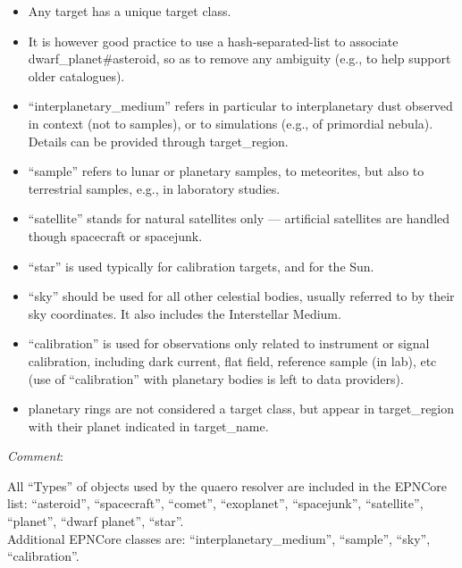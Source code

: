 \documentclass[11pt,a4paper]{ivoa}
\begin{document}
\begin{itemize}

\item Any target has a unique target class.

\item It is however good practice to use a hash-separated-list to
associate dwarf\_planet\#asteroid, so as to remove any ambiguity
(e.g., to help support older catalogues).

\item ``interplanetary\_medium'' refers in particular to interplanetary
dust observed in context (not to samples), or to simulations
(e.g., of primordial nebula).
Details can be provided through target\_region.

\item ``sample'' refers to lunar or planetary samples, to meteorites,
but also to terrestrial samples, e.g., in laboratory studies.

\item ``satellite'' stands for natural satellites only --- artificial
satellites are handled though spacecraft or spacejunk.

\item ``star'' is used typically for calibration targets, and for the Sun.

\item ``sky'' should be used for all other celestial bodies,
usually referred to by their sky coordinates.
It also includes the Interstellar Medium.

\item ``calibration'' is used for observations only related to instrument
or signal calibration, including dark current, flat field, reference
sample (in lab), etc (use of ``calibration'' with planetary bodies is
left to data providers).

\item planetary rings are not considered a target class, but appear in
target\_region with their planet indicated in target\_name.

\end{itemize}

\emph{Comment}:

All ``Types'' of objects used by the quaero resolver are included
in the EPNCore list: ``asteroid'', ``spacecraft'', ``comet'',
``exoplanet'', ``spacejunk'', ``satellite'', ``planet'', ``dwarf planet'',
``star''.\\Additional EPNCore classes are: ``interplanetary\_medium'',
``sample'', ``sky'', ``calibration''.
\end{document}
